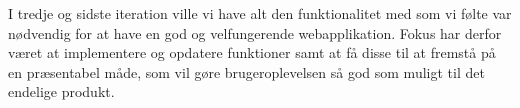 I tredje og sidste iteration ville vi have alt den funktionalitet med som vi følte var nødvendig for at have en god og velfungerende webapplikation. Fokus har derfor været at implementere og opdatere funktioner samt at få disse til at fremstå på en præsentabel måde, som vil gøre brugeroplevelsen så god som muligt til det endelige produkt.
















